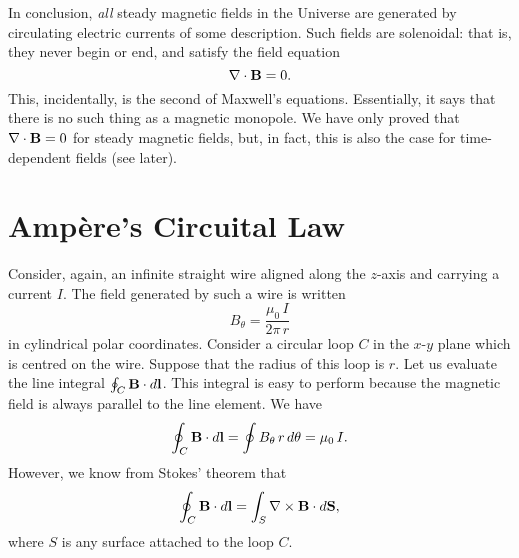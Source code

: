 In conclusion, {\em all}\/ steady magnetic fields in the Universe are generated by 
circulating electric currents of some description. Such fields are solenoidal:
that is, they never begin or end, and satisfy the field equation
\begin{equation}
\nabla \cdot {\bf B} = 0.
\end{equation}
This, incidentally,
 is the second of Maxwell's equations. Essentially, it says that there is no
such thing as a magnetic monopole. We have only proved that $\nabla\cdot{\bf B} =0$
 for
steady magnetic fields, but, in fact, this is also the case  for time-dependent fields
(see later).

\section{Amp\`{e}re's Circuital Law}
Consider, again, an infinite straight wire aligned along the $z$-axis and  carrying
a current $I$. The field generated by such a wire is written
\begin{equation}
B_\theta = \frac{\mu_0\, I}{2\pi \,r}
\end{equation}
in cylindrical polar coordinates. Consider a circular loop $C$ in the $x$-$y$ plane
which is centred on the wire. Suppose that the radius of this loop is $r$.
Let us evaluate the line integral $\oint_C {\bf B} \cdot d{\bf l}$.
This integral is easy to perform because the magnetic field is
always  parallel to the
line element. 
We have
\begin{equation}\label{e388}
\oint_C {\bf B} \cdot d{\bf l} = \oint B_\theta \,r\,d\theta= \mu_0 \,I.
\end{equation}
However, we know from Stokes' theorem that
\begin{equation}\label{e389}
\oint_C {\bf B} \cdot d{\bf l} = \int_S \nabla\times {\bf B} \cdot d{\bf S},
\end{equation}
where $S$ is any surface attached to the loop $C$. 

